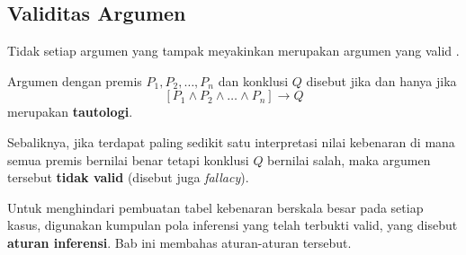 \subsection{Validitas Argumen}

Tidak setiap argumen yang tampak meyakinkan merupakan argumen yang valid \cite{wiki_first_order_logic}.

\begin{teorema}
Argumen dengan premis $P_1, P_2, \ldots, P_n$ dan konklusi $Q$ disebut  jika dan hanya jika
\[ [P_1 \wedge P_2 \wedge \ldots \wedge P_n] \rightarrow Q \]
merupakan \textbf{tautologi}.
\end{teorema}

Sebaliknya, jika terdapat paling sedikit satu interpretasi nilai kebenaran di mana semua premis bernilai benar tetapi konklusi $Q$ bernilai salah, maka argumen tersebut \textbf{tidak valid} (disebut juga \textit{fallacy}).

Untuk menghindari pembuatan tabel kebenaran berskala besar pada setiap kasus, digunakan kumpulan pola inferensi yang telah terbukti valid, yang disebut \textbf{aturan inferensi}. Bab ini membahas aturan-aturan tersebut.
